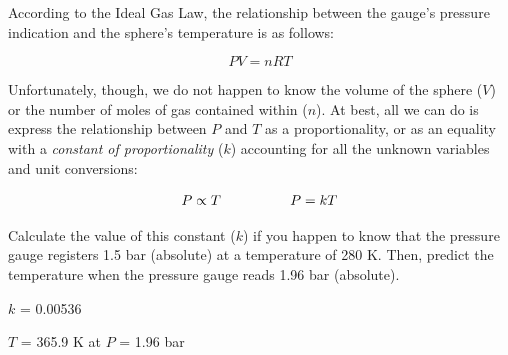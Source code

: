 According to the Ideal Gas Law, the relationship between the gauge's pressure indication and the sphere's temperature is as follows:

$$PV = nRT$$

Unfortunately, though, we do not happen to know the volume of the sphere ($V$) or the number of moles of gas contained within ($n$).  At best, all we can do is express the relationship between $P$ and $T$ as a proportionality, or as an equality with a {\it constant of proportionality} ($k$) accounting for all the unknown variables and unit conversions:

$$P \propto T \hbox{\hskip 50pt} P = kT$$

Calculate the value of this constant ($k$) if you happen to know that the pressure gauge registers 1.5 bar (absolute) at a temperature of 280 K.  Then, predict the temperature when the pressure gauge reads 1.96 bar (absolute).







$k$ = 0.00536

\vskip 10pt

$T$ = 365.9 K at $P$ = 1.96 bar











